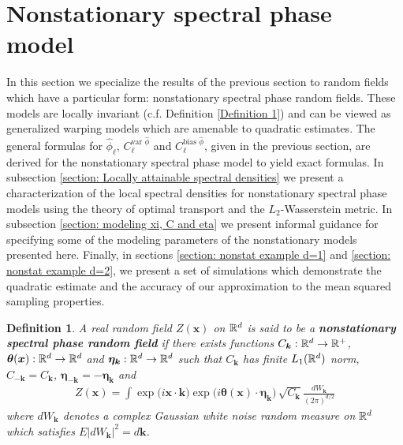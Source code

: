 \documentclass[10pt,noinfoline]{imsart}
\newtheorem{definition}{Definition}
\newcommand{\bs}{\boldsymbol}
\begin{document}
%
%
\section{Nonstationary spectral phase model}
\label{section: NPhase}


In this section we specialize the results of the previous section to random fields which have a particular form: nonstationary spectral phase random fields. These models are locally invariant (c.f. Definition \ref{Definition 1}) and can be viewed as generalized warping models which are amenable to quadratic estimates. The general formulas for $\hat\phi_{\bs \ell}$, $C_{\bs \ell}^{\text{var }\hat\phi}$ and $C_{\bs \ell}^{\text{bias }\hat\phi}$, given in the previous section, are derived for the nonstationary spectral phase model to yield exact formulas. In subsection \ref{section: Locally attainable spectral densities} we present a characterization of the local spectral densities for nonstationary spectral phase models using the theory of optimal transport and the $L_2$-Wasserstein metric. In subsection \ref{section: modeling xi, C and eta} we present informal guidance for specifying some of the modeling parameters of the nonstationary models presented here.
Finally, in sections \ref{section: nonstat example d=1} and \ref{section: nonstat example d=2}, we 
present a set of simulations which demonstrate the quadratic estimate and the accuracy of our approximation to the mean squared sampling properties. 



\begin{definition}\label{def: nonstate phase}
A real random field $Z(\bs x)$ on $\Bbb R^d$ is said to be a \textbf{nonstationary spectral phase random field} if there exists  functions $C_{\bs k}:\Bbb R^d \rightarrow \Bbb R^+$, $\bs \theta(\bs x):\Bbb R^d \rightarrow \Bbb R^d$ and  $\bs\eta_{\bs k}:\Bbb R^d \rightarrow \Bbb R^d$ such that $C_{\bs k}$ has finite $L_1(\Bbb R^d)$ norm, $C_{-\bs k} = C_{\bs k}$,  $\bs \eta_{-\bs k} =-\bs\eta_{\bs k}$ and 
\begin{align}
\label{eq: nonstate phase}
Z(\bs x)= \int \exp\big(i\bs x\cdot \bs k\big)\exp\big(i\bs\theta(\bs x) \cdot \bs\eta_{\bs k}\big) \,\sqrt{C_{\bs k}} \frac{dW_{\bs k}}{(2\pi)^{d/2}}
\end{align}
where $dW_{\bs k}$  denotes a complex Gaussian white noise random measure on $\Bbb R^d$ which satisfies $E|dW_{\bs k}|^2 = d\bs k$.
\end{definition}
\end{document}
